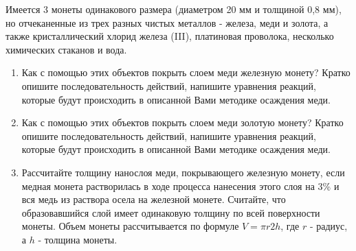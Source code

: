 
Имеется 3 монеты одинакового размера (диаметром 20 мм и толщиной 0,8 мм), но отчеканенные  из трех разных чистых 
металлов - железа, меди и золота, а также кристаллический хлорид железа (III), платиновая проволока, несколько 
химических стаканов и вода.

\begin{enumerate}
    \item Как с помощью этих объектов покрыть слоем меди железную монету? 
    Кратко опишите последовательность действий, напишите уравнения реакций, которые будут происходить в описанной Вами методике осаждения меди.
    \item Как с помощью этих объектов покрыть слоем меди золотую монету? 
    Кратко опишите последовательность действий, напишите уравнения реакций, которые будут происходить в описанной Вами методике осаждения меди.
    \item Рассчитайте толщину нанослоя меди, покрывающего железную монету, если медная монета растворилась в ходе 
    процесса нанесения этого слоя на 3\% и вся медь из раствора осела на железной монете. Считайте, что 
    образовавшийся слой имеет одинаковую толщину по всей поверхности монеты. Объем монеты рассчитывается по 
    формуле $V = \pi r2h$, где $r$ - радиус, а $h$ - толщина монеты.    
\end{enumerate}

